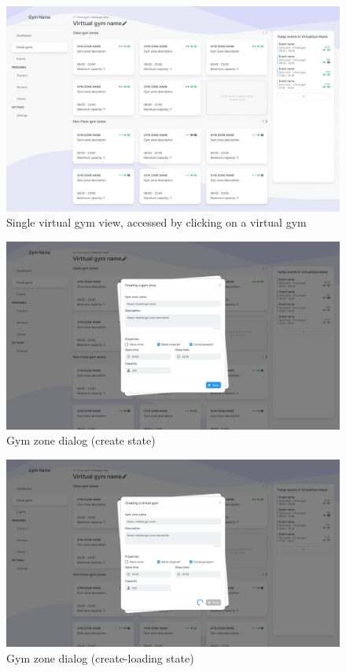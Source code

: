 \documentclass[a4paper, 12pt, oneside]{book}
\begin{document}
\begin{figure}[H]
	\centering
	\includegraphics[width=\textwidth]{assets/ui/VirtualGym.png}
	\caption{Single virtual gym view, accessed by clicking on a virtual gym}
\end{figure}
\begin{figure}[H]
	\centering
	\includegraphics[width=\textwidth]{assets/ui/CreateGymZone.png}
	\caption{Gym zone dialog (create state)}
\end{figure}
\begin{figure}[H]
	\centering
	\includegraphics[width=\textwidth]{assets/ui/CreateLoadingGymZone.png}
	\caption{Gym zone dialog (create-loading state)}
\end{figure}
\end{document}
